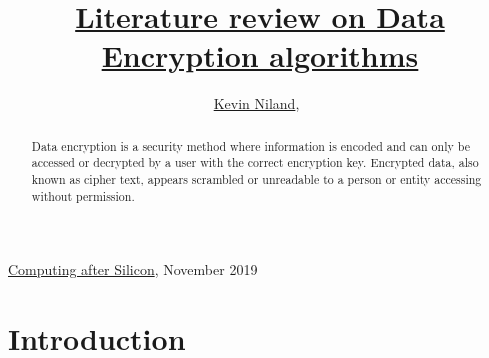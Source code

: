 \documentclass[journal]{IEEEtran}
\begin{document}
%
{\href{https://github.com/kevinniland97/Literature-review-on-Data-Encryption-algorithm}{Computing after Silicon}, November 2019}

\title{\href{https://github.com/kevinniland97/Literature-review-on-Data-Encryption-algorithms}{Literature review on Data Encryption algorithms}}
\author{\href{https://github.com/kevinniland97}{Kevin Niland},~}
\maketitle

\begin{abstract}
    Data encryption is a security method where information is encoded and can only be accessed or decrypted by a user with the correct encryption key. Encrypted data, also known as cipher text, appears scrambled or unreadable to a person or entity accessing without permission.
\end{abstract}

\section{Introduction}
\end{document}
